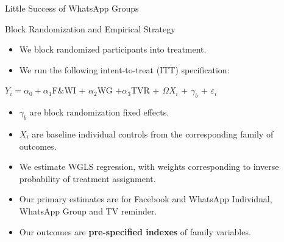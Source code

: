\documentclass[10pt]{beamer}
\begin{document}
\begin{frame}{Little Success of WhatsApp Groups}
\begin{table}[H]
\centering
\label{table:group_conversations}
\end{table}
\end{frame}

\begin{frame}{Block Randomization and Empirical Strategy}
\begin{itemize}
    \item We block randomized participants into treatment.
    \item We run the following intent-to-treat (ITT) specification:
\end{itemize}
\begin{center}
$Y_i = \alpha_0 + \alpha_1$F\&WI + $\alpha_2$WG $+ \alpha_3$TVR + $\Omega X_i$ + $\gamma_b$ + $\varepsilon_i$
\end{center}
\begin{itemize}
\item $\gamma_b$ are block randomization fixed effects.
\item $X_i$ are baseline individual controls from the corresponding family of outcomes. 
\item We estimate WGLS regression, with weights corresponding to inverse probability of treatment assignment.
\item Our primary estimates are for  Facebook and WhatsApp Individual, WhatsApp Group and TV reminder.
\item Our outcomes are \textbf{pre-specified indexes} of family variables. 
\end{itemize}
 \end{frame}
\end{document}
